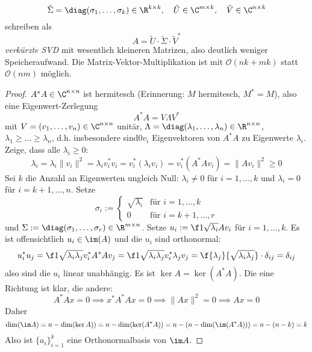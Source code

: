 \documentclass[a4paper,11pt]{scrartcl}
\begin{document}
\begin{st}
\begin{note}
\begin{itemize}
				\[
					\tilde \Sigma = \diag(\sigma_1,\dotsc,\sigma_k) \in \R^{k\times k}, \quad \tilde U \in \C^{m\times k}, \quad \tilde V \in \C^{n\times k}
				\]
				schreiben als
				\[
					A = \tilde U \cdot \tilde \Sigma \cdot \tilde V^*
				\]
				\emph{verkürzte SVD} mit wesentlich kleineren Matrizen, also deutlich weniger Speicheraufwand.
				Die Matrix-Vektor-Multiplikation ist mit $\mathcal O(nk+mk)$ statt $\mathcal O(nm)$ möglich.
		\end{itemize}
	\end{note}
	\begin{proof}
		$A^*A \in \C^{n\times n}$ ist hermitesch (Erinnerung: $M$ hermitesch, $M^*=M$), also eine Eigenwert-Zerlegung
		\[
			A^*A = V\Lambda V^*
		\]
		mit $V=(v_1,\dotsc, v_n)\in \C^{n\times n}$ unitär, $\Lambda = \diag(\lambda_1,\dotsc,\lambda_n) \in \R^{n\times n}$, $\lambda_1\ge \dotsc \ge \lambda_n$, d.h. insbesondere sind0$v_i$ Eigenvektoren von $A^*A$  zu Eigenwerte $\lambda_i$.
		Zeige, dass alle $\lambda_i \ge 0$:
		\[
			\lambda_i = \lambda_i \|v_i\|^2 = \lambda_iv_i^*v_i = v_i^*(\lambda_iv_i) = v_i^*(A^*Av_i) = \|Av_i\|^2 \ge 0
		\]
		Sei $k$ die Anzahl an Eigenwerten ungleich Null: $\lambda_i \neq 0$ für $i=1,\dotsc,k$ und $\lambda_i=0$ für $i=k+1,\dotsc,n$.
		Setze 
		\[
			\sigma_i := \begin{cases}
				\sqrt{\lambda_i} & \text{für $i=1,\dotsc,k$} \\
				0 & \text{für $i=k+1,\dotsc, r$}
			\end{cases}
		\]
		und $\Sigma := \diag(\sigma_1,\dotsc,\sigma_r) \in \R^{m\times n}$.
		Setze $u_i := \f 1{\sqrt{\lambda_i}}Av_i$ für $i=1,\dotsc,k$.
		Es ist offensichtlich $u_i\in \im(A)$ und die $u_i$ sind orthonormal:
		\[
			u_i^*u_j = \f 1{\sqrt{\lambda_i \lambda_j}} v_i^* A^*Av_j
			= \f 1{\sqrt{\lambda_i\lambda_j}}v_i^* \lambda_j v_j
			= \f {\lambda_j} {\sqrt{\lambda_i \lambda_j}}\cdot \delta_{ij} = \delta_{ij}
		\]
		also sind die $u_i$ linear unabhängig.
		Es ist $\ker A = \ker (A^*A)$.
		Die eine Richtung ist klar, die andere:
		\[
			A^*A x = 0 \implies x^*A^*Ax = 0 \implies \|Ax\|^2 = 0 \implies Ax=0
		\]
		Daher
		\[
			\dim(\im A) = n- \dim (\ker A)) = n-\dim (\ker(A^*A)) = n- (n- \dim(\im(A^*A))) = n-(n-k) = k
		\]
		Also ist $\{a_i\}_{i=1}^k$ eine Orthonormalbasis von $\im A$.


\end{proof}
\end{st}
\end{document}
